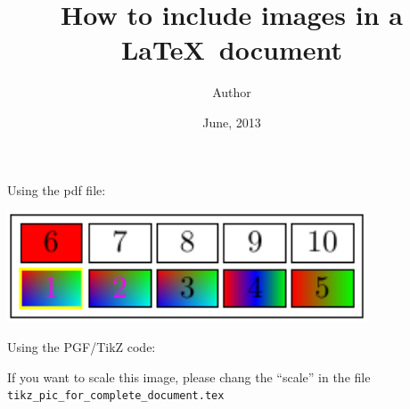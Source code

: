 \documentclass{article}
\author{Author}
\title{How to include images in a \LaTeX\ document}
\date{June, 2013}
\begin{document}
\begin{preview}
\maketitle
Using the pdf file:

\begin{center}
        \includegraphics[width=0.80\textwidth]{../images/pic_for_complete_document.pdf}
\end{center}

Using the PGF/TikZ code:

\begin{center}

\end{center}
If you want to scale this image, please chang the ``scale'' in the file
\texttt{tikz\_pic\_for\_complete\_document.tex} 
\end{preview}
\end{document}
